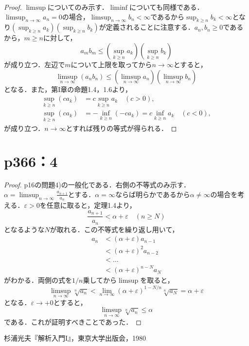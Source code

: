 \documentclass[a4paper,10pt,fleqn]{ltjsarticle}
\begin{document}
\begin{leftbar}
    \begin{proof}
        $\limsup$についてのみ示す．$\liminf$についても同様である．
        $\limsup_{n \to \infty} a_n = 0$の場合，$\limsup_{n \to \infty} b_n < \infty$であるから$\sup_{k \geq n} b_k < \infty$となり$\left(\sup _{k \geq n} a_k\right) \left(\sup _{k \geq n} b_k\right)$が定義されることに注意する．$a_n, b_n \geq 0$であるから，$m \geq n$に対して，
        \[
            a_m b_m \leq \left(\sup _{k \geq n} a_k\right) \left(\sup _{k \geq n} b_k\right)
        \]
        が成り立つ．左辺で$m$について上限を取ってから$n \to \infty$とすると，
        \[
            \limsup_{n \to \infty} (a_n b_n) \leq \left(\limsup _{n \to \infty} a_n\right) \left(\limsup_{n \to \infty} b_n\right)
        \]
        となる．また，第I章の命題1.4，1.6より，
        \begin{align*}
            \sup_{k \geq n} (c a_k) & = c\sup_{k \geq n} a_k \quad (c > 0),                             \\
            \sup_{k \geq n} (c a_k) & = -\inf_{k \geq n} (-c a_k) = c\inf_{k \geq n} a_k \quad (c < 0),
        \end{align*}
        が成り立つ．$n \to \infty$とすれば残りの等式が得られる．
    \end{proof}
\end{leftbar}

\section*{p366：4}

\begin{leftbar}
    \begin{proof}
        p16の問題4)の一般化である．右側の不等式のみ示す．
        $\alpha = \limsup _{n \to \infty} \frac{a_{n+1}}{a_{n}}$とする．$\alpha = \infty$ならば明らかであるから$\alpha \neq \infty$の場合を考える．$\varepsilon > 0$を任意に取ると，定理1.4より，
        \[
            \frac{a_{n+1}}{a_{n}} < \alpha + \varepsilon \quad (n \geq N)
        \]
        となるような$N$が取れる．この不等式を繰り返し用いて，
        \begin{align*}
            a_n
             & < (\alpha + \varepsilon) a_{n-1}   \\
             & < (\alpha + \varepsilon)^2 a_{n-2} \\
             & < \ldots                           \\
             & < (\alpha + \varepsilon)^{n-N} a_N
        \end{align*}
        がわかる．両側の式を$1/n$乗してから$\limsup$を取ると，
        \[
            \limsup _{n \to \infty} \sqrt[n]{a_n} < \lim _{n \to \infty} (\alpha + \varepsilon)^{1-N/n} \sqrt[n]{a_N} = \alpha + \varepsilon
        \]
        となる．$\varepsilon \to +0$とすると，
        \[
            \limsup _{n \to \infty} \sqrt[n]{a_n} \leq \alpha
        \]
        である．これが証明すべきことであった．
    \end{proof}
\end{leftbar}

\newpage

\begin{thebibliography}{9}
     杉浦光夫『解析入門I』，東京大学出版会，1980
\end{thebibliography}
\end{document}
